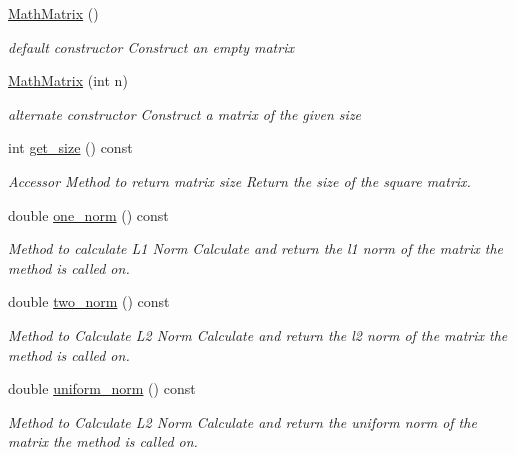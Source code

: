 \begin{DoxyCompactItemize}
\item 
\hypertarget{class_math_matrix_a7a05acdde6c68c2816abf2437b2241bc}{\hyperlink{class_math_matrix_a7a05acdde6c68c2816abf2437b2241bc}{Math\-Matrix} ()}\label{class_math_matrix_a7a05acdde6c68c2816abf2437b2241bc}

\begin{DoxyCompactList}\small\item\em default constructor Construct an empty matrix \end{DoxyCompactList}\item 
\hyperlink{class_math_matrix_a1f79dbe6088d6392fbf62110166d4222}{Math\-Matrix} (int n)
\begin{DoxyCompactList}\small\item\em alternate constructor Construct a matrix of the given size \end{DoxyCompactList}\item 
int \hyperlink{class_math_matrix_a8c35ac25975c9925d220792ca55a6778}{get\-\_\-size} () const 
\begin{DoxyCompactList}\small\item\em Accessor Method to return matrix size Return the size of the square matrix. \end{DoxyCompactList}\item 
double \hyperlink{class_math_matrix_a55143b6ee71b6d2a568ffeb99c4f0d9b}{one\-\_\-norm} () const 
\begin{DoxyCompactList}\small\item\em Method to calculate L1 Norm Calculate and return the l1 norm of the matrix the method is called on. \end{DoxyCompactList}\item 
double \hyperlink{class_math_matrix_a28bcb4dd7a3a90f9c5111b2c826b2266}{two\-\_\-norm} () const 
\begin{DoxyCompactList}\small\item\em Method to Calculate L2 Norm Calculate and return the l2 norm of the matrix the method is called on. \end{DoxyCompactList}\item 
double \hyperlink{class_math_matrix_acc7fa38ce97cd0f96587566d283532d7}{uniform\-\_\-norm} () const 
\begin{DoxyCompactList}\small\item\em Method to Calculate L2 Norm Calculate and return the uniform norm of the matrix the method is called on. \end{DoxyCompactList}\item 

\end{DoxyCompactItemize}
